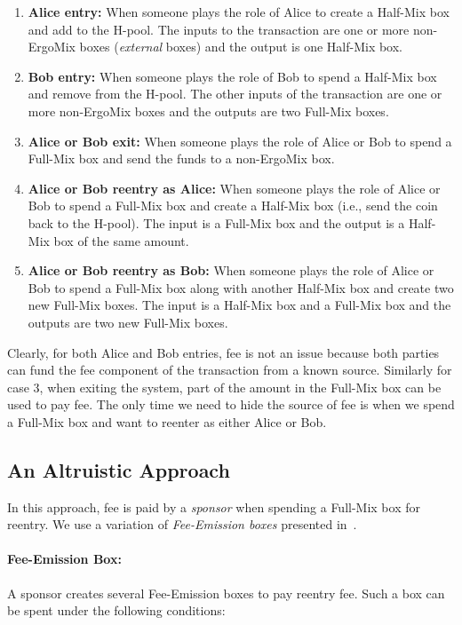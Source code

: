 \documentclass[runningheads]{llncs}
\newcommand{\mixname}{ErgoMix\xspace}
\begin{document}
\begin{enumerate}
    \item \textbf{Alice entry:} When someone plays the role of Alice to create a Half-Mix box and add to the H-pool. The inputs to the transaction are one or more non-\mixname boxes ({\em external} boxes) and the output is one Half-Mix box. 
    \item \textbf{Bob entry:} When someone plays the role of Bob to spend a Half-Mix box and remove from the H-pool. The other inputs of the transaction are one or more non-\mixname boxes and the outputs are two Full-Mix boxes. 
    \item \textbf{Alice or Bob exit:} When someone plays the role of Alice or Bob to spend a Full-Mix box and send the funds to a non-\mixname box. 
    \item \textbf{Alice or Bob reentry as Alice:} When someone plays the role of Alice or Bob to spend a Full-Mix box and create a Half-Mix box (i.e., send the coin back to the H-pool). The input is a Full-Mix box and the output is a Half-Mix box of the same amount.
    \item \textbf{Alice or Bob reentry as Bob:} When someone plays the role of Alice or Bob to spend a Full-Mix box along with another Half-Mix box and create two new Full-Mix boxes. The input is a Half-Mix box and a Full-Mix box and the outputs are two new Full-Mix boxes.
\end{enumerate}

Clearly, for both Alice and Bob entries, fee is not an issue because both parties can fund the fee component of the transaction from a known source. Similarly for case 3, when exiting the system, part of the amount in the Full-Mix box can be used to pay fee. The only time we need to hide the source of fee is when we spend a Full-Mix box and want to reenter as either Alice or Bob. 

\subsection{An Altruistic Approach}
\label{donation}

In this approach, fee is paid by a {\em sponsor} when spending a Full-Mix box for reentry. 
We use a variation of {\em Fee-Emission boxes} presented in~\cite{Fee-Emission}. 

\paragraph{Fee-Emission Box:} A sponsor creates several Fee-Emission boxes to pay reentry fee. Such a box can be spent under the following conditions:
\end{document}
